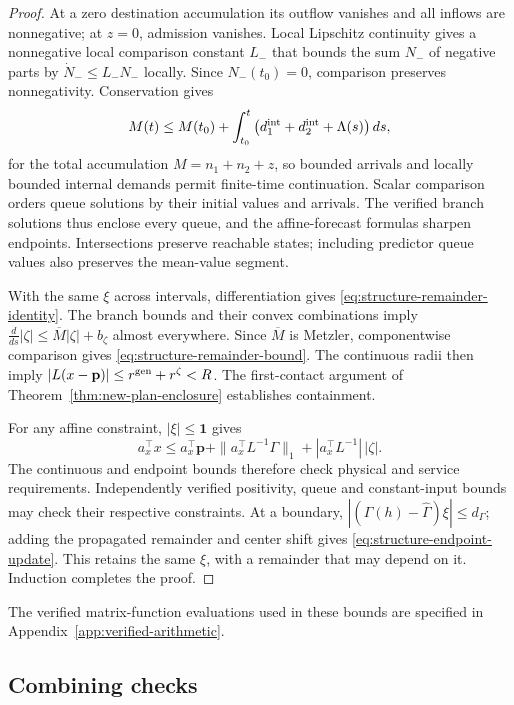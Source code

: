 \documentclass[final]{cas-sc}
\theoremstyle{definition}
\theoremstyle{plain}
\theoremstyle{definition}
\theoremstyle{plain}
\newcommand{\appref}[1]{Appendix~\ref{#1}}
\begin{document}
\begin{proof}
At a zero destination accumulation its outflow vanishes and all inflows
are nonnegative; at $z=0$, admission vanishes. Local Lipschitz
continuity gives a nonnegative local comparison constant $L_-$ that
bounds the sum $N_-$ of negative parts by $\dot N_-\le L_-N_-$ locally.
Since $N_-(t_0)=0$, comparison \cite{khalil2002nonlinear} preserves
nonnegativity. Conservation gives
\[
M(t)\le M(t_0)+\int_{t_0}^{t}
\big(d_1^{\rm int}+d_2^{\rm int}+\Lambda(s)\big)\,ds,
\]
for the total accumulation $M=n_1+n_2+z$, so bounded arrivals and
locally bounded internal demands permit finite-time continuation. Scalar comparison orders queue solutions by
their initial values and arrivals. The verified branch solutions thus
enclose every queue, and the affine-forecast formulas sharpen
endpoints. Intersections preserve reachable states; including predictor
queue values also preserves the mean-value segment.

With the same $\xi$ across intervals, differentiation gives
\eqref{eq:structure-remainder-identity}. The branch bounds and their convex
combinations imply
$\frac{d}{ds}|\zeta|\le\overline M|\zeta|+b_\zeta$ almost everywhere.
Since $\overline M$ is Metzler, componentwise comparison gives
\eqref{eq:structure-remainder-bound}. The continuous radii then imply
$|L(x-\mathbf p)|\le r^{\rm gen}+r^{\zeta}<R$. The first-contact
argument of Theorem~\ref{thm:new-plan-enclosure} establishes containment.

For any affine constraint, $|\xi|\le\mathbf 1$ gives
\[
a_x^\top x\le a_x^\top\mathbf p+\|a_x^\top L^{-1}\Gamma\|_1
+|a_x^\top L^{-1}|\,|\zeta|.
\]
The continuous and endpoint bounds therefore check physical and service
requirements. Independently verified positivity, queue and
constant-input bounds may check their respective constraints. At a
boundary, $|(\Gamma(h)-\widehat\Gamma)\xi|\le d_\Gamma$; adding the
propagated remainder and center shift gives
\eqref{eq:structure-endpoint-update}. This retains the same $\xi$, with a
remainder that may depend on it. Induction completes the proof.
\end{proof}

The verified matrix-function evaluations used in these bounds are
specified in \appref{app:verified-arithmetic}.

\subsection{Combining checks}
\label{sec:combining-checks}
\end{document}
